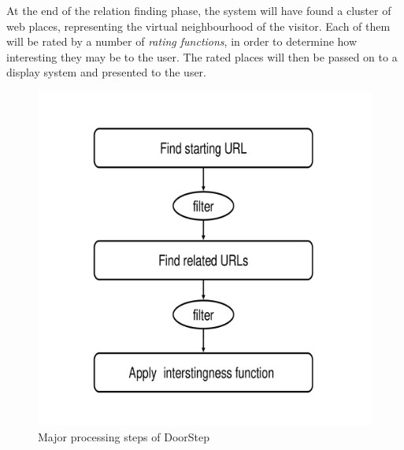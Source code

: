 \documentclass[a4paper]{danarticle}
\theoremstyle{remark}
\begin{document}
      At the end of the relation finding phase, the system will have found a
      cluster of web places, representing the virtual neighbourhood of the
      visitor. Each of them will be rated by a number of \textit{rating
      functions}, in order to determine how interesting they may be to the user.
      The rated places will then be passed on to a display system and presented  
      to the user.
      \begin{figure}[ht]
        \centering
	\includegraphics[width=12cm]{steps_overview}
	\caption{Major processing steps of DoorStep}
	\label{steps_overview}
      \end{figure}
\end{document}

